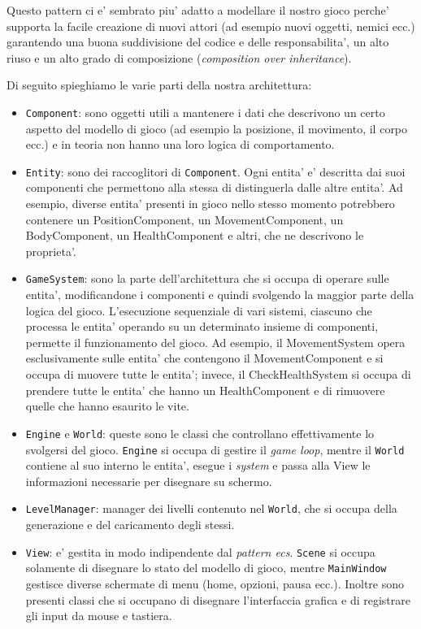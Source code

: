 \documentclass[a4paper,12pt]{report}
\begin{document}
Questo pattern ci e' sembrato piu' adatto a modellare il nostro gioco perche' supporta la facile creazione di nuovi attori (ad esempio nuovi oggetti, nemici ecc.) garantendo una buona suddivisione del codice e delle responsabilita', un alto riuso e un alto grado di composizione (\textit{composition over inheritance}). 





Di seguito spieghiamo le varie parti della nostra architettura:
\begin{itemize}
	\item \texttt{Component}: sono oggetti utili a mantenere i dati che descrivono un certo aspetto del modello di gioco (ad esempio la posizione, il movimento, il corpo ecc.) e in teoria non hanno una loro logica di comportamento.
	\item \texttt{Entity}: sono dei raccoglitori di \texttt{Component}. Ogni entita' e' descritta dai suoi componenti che permettono alla stessa di distinguerla dalle altre entita'. Ad esempio, diverse entita' presenti in gioco nello stesso momento potrebbero contenere un PositionComponent, un MovementComponent, un BodyComponent, un HealthComponent e altri, che ne descrivono le proprieta'.
	\item \texttt{GameSystem}: sono la parte dell'architettura che si occupa di operare sulle entita', modificandone i componenti e quindi svolgendo la maggior parte della logica del gioco. L'esecuzione sequenziale di vari sistemi, ciascuno che processa le entita' operando su un determinato insieme di componenti, permette il funzionamento del gioco. Ad esempio, il MovementSystem opera esclusivamente sulle entita' che contengono il MovementComponent e si occupa di muovere tutte le entita'; invece, il CheckHealthSystem si occupa di prendere tutte le entita' che hanno un HealthComponent e di rimuovere quelle che hanno esaurito le vite.
	\item \texttt{Engine} e \texttt{World}: queste sono le classi che controllano effettivamente lo svolgersi del gioco. \texttt{Engine} si occupa di gestire il \textit{game loop}, mentre il \texttt{World} contiene al suo interno le entita', esegue i \textit{system} e passa alla View le informazioni necessarie per disegnare su schermo.
	\item \texttt{LevelManager}: manager dei livelli contenuto nel \texttt{World}, che si occupa della generazione e del caricamento degli stessi.
	\item \texttt{View}: e' gestita in modo indipendente dal \textit{pattern ecs}. \texttt{Scene} si occupa solamente di disegnare lo stato del modello di gioco, mentre \texttt{MainWindow} gestisce diverse schermate di menu (home, opzioni, pausa ecc.). Inoltre sono presenti classi che si occupano di disegnare l'interfaccia grafica e di registrare gli input da mouse e tastiera.
\end{itemize}
\end{document}
